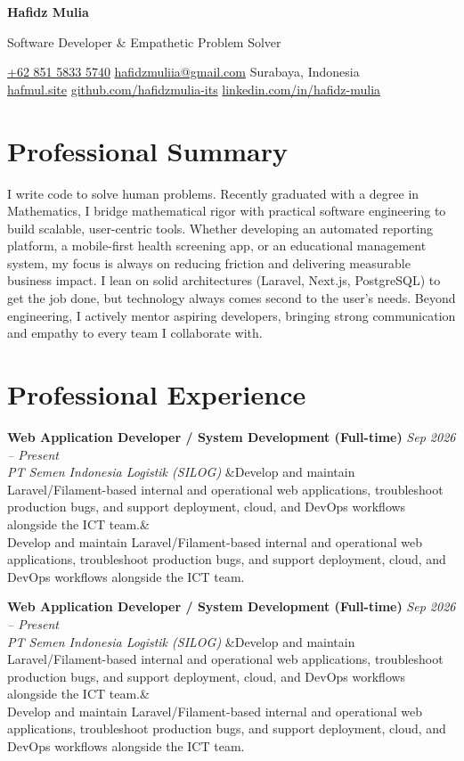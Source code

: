 \documentclass[a4paper,11pt]{article}
\newcommand{\cvname}[1]{%
  {\centering\LARGE\bfseries #1\par\vspace{2pt}}%
}
\newcommand{\cvtitle}[1]{%
  {\centering\large\color{accent} #1\par\vspace{4pt}}%
}
\newcommand{\cvcontact}[1]{%
  {\centering\small #1\par\vspace{6pt}}%
}
\newcommand{\cventry}[4]{%
  \noindent\textbf{#1} \hfill \textit{#3} \\
  \textit{#2}
  \ifx&#4& \else \\ \small #4 \fi
  \vspace{6pt}
}
\begin{document}
\cvname{Hafidz Mulia}
\cvtitle{Software Developer \& Empathetic Problem Solver}
\cvcontact{%
  \href{tel:+6285158335740}{+62 851 5833 5740} \quad\textbar\quad
  \href{mailto:hafidzmuliia@gmail.com}{hafidzmuliia@gmail.com} \quad\textbar\quad
  Surabaya, Indonesia \\
  \href{https://hafmul.site}{hafmul.site} \quad\textbar\quad
  \href{https://github.com/hafidzmulia-its}{github.com/hafidzmulia-its} \quad\textbar\quad
  \href{https://www.linkedin.com/in/hafidz-mulia/}{linkedin.com/in/hafidz-mulia}
}

\section{Professional Summary}
I write code to solve human problems. Recently graduated with a degree in Mathematics, I bridge mathematical rigor with practical software engineering to build scalable, user-centric tools. Whether developing an automated reporting platform, a mobile-first health screening app, or an educational management system, my focus is always on reducing friction and delivering measurable business impact. I lean on solid architectures (Laravel, Next.js, PostgreSQL) to get the job done, but technology always comes second to the user's needs. Beyond engineering, I actively mentor aspiring developers, bringing strong communication and empathy to every team I collaborate with.

\section{Professional Experience}

\cventry
  {Web Application Developer / System Development (Full-time)}
  {PT Semen Indonesia Logistik (SILOG)}
  {Sep 2026 -- Present}
  {Develop and maintain Laravel/Filament-based internal and operational web applications, troubleshoot production bugs, and support deployment, cloud, and DevOps workflows alongside the ICT team.}

\cventry
  {Web Application Developer / System Development (Full-time)}
  {PT Semen Indonesia Logistik (SILOG)}
  {Sep 2026 -- Present}
  {Develop and maintain Laravel/Filament-based internal and operational web applications, troubleshoot production bugs, and support deployment, cloud, and DevOps workflows alongside the ICT team.}
\end{document}
